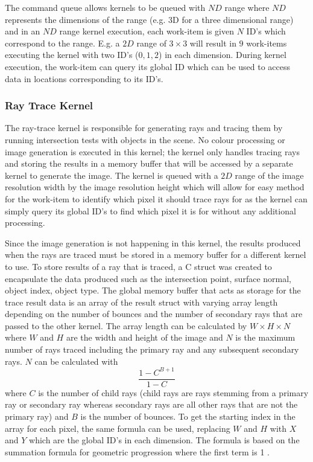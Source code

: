 \documentclass[final]{cmpreport}
\begin{document}
The command queue allows kernels to be queued with $ND$ range where $ND$ represents the dimensions of the range (e.g. 3D for a three dimensional range) and in an $ND$ range kernel execution, each work-item is given $N$ ID's which correspond to the range. E.g. a $2D$ range of $3 \times 3$ will result in $9$ work-items executing the kernel with two ID's ($0, 1, 2$) in each dimension. During kernel execution, the work-item can query its global ID which can be used to access data in locations corresponding to its ID's. \citep{barringer2017ray}

\subsubsection{Ray Trace Kernel}

The ray-trace kernel is responsible for generating rays and tracing them by running intersection tests with objects in the scene. No colour processing or image generation is executed in this kernel; the kernel only handles tracing rays and storing the results in a memory buffer that will be accessed by a separate kernel to generate the image. The kernel is queued with a $2D$ range of the image resolution width by the image resolution height which will allow for easy method for the work-item to identify which pixel it should trace rays for as the kernel can simply query its global ID's to find which pixel it is for without any additional processing.

Since the image generation is not happening in this kernel, the results produced when the rays are traced must be stored in a memory buffer for a different kernel to use. To store results of a ray that is traced, a C struct was created to encapsulate the data produced such as the intersection point, surface normal, object index, object type. The global memory buffer that acts as storage for the trace result data is an array of the result struct with varying array length depending on the number of bounces and the number of secondary rays that are passed to the other kernel. The array length can be calculated by $W \times H \times N$ where $W$ and $H$ are the width and height of the image and $N$ is the maximum number of rays traced including the primary ray and any subsequent secondary rays. $N$ can be calculated with $$\frac{1 - C^{B+1}}{1-C}$$ where $C$ is the number of child rays (child rays are rays stemming from a primary ray or secondary ray whereas secondary rays are all other rays that are not the primary ray) and $B$ is the number of bounces.
To get the starting index in the array for each pixel, the same formula can be used, replacing $W$ and $H$ with $X$ and $Y$ which are the global ID's in each dimension. The formula is based on the summation formula for geometric progression where the first term is 1 \citep{rosen1999handbook}.
\end{document}
